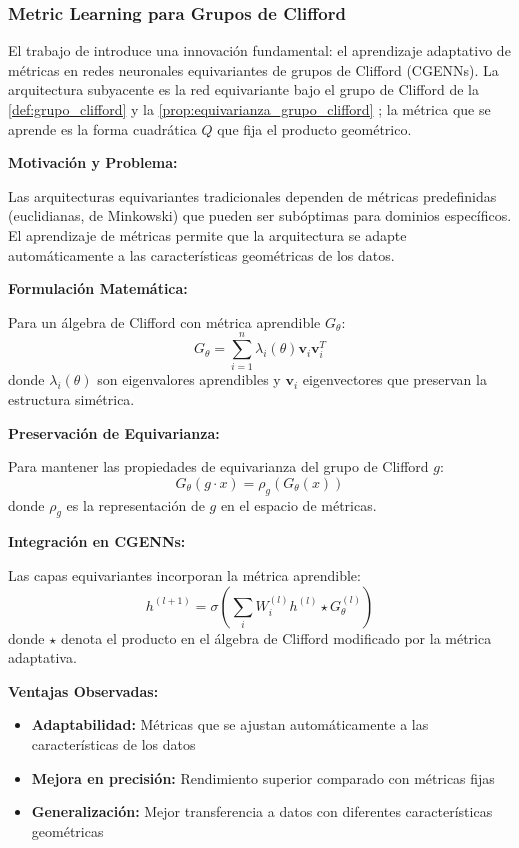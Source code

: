 \subsubsection{Metric Learning para Grupos de Clifford}

El trabajo de \citet{ali2024metriclearning} introduce una innovación fundamental: el aprendizaje adaptativo de métricas en redes neuronales equivariantes de grupos de Clifford (CGENNs). La arquitectura subyacente es la red equivariante bajo el grupo de Clifford de la \autoref{def:grupo_clifford} y la \autoref{prop:equivarianza_grupo_clifford} \citep{ruhe2023cliffordgroup, ali2024metriclearning}; la métrica que se aprende es la forma cuadrática $Q$ que fija el producto geométrico.

\textbf{Motivación y Problema:}

Las arquitecturas equivariantes tradicionales dependen de métricas predefinidas (euclidianas, de Minkowski) que pueden ser subóptimas para dominios específicos. El aprendizaje de métricas permite que la arquitectura se adapte automáticamente a las características geométricas de los datos.

\textbf{Formulación Matemática:}

Para un álgebra de Clifford con métrica aprendible $G_\theta$:
\[G_\theta = \sum_{i=1}^n \lambda_i(\theta) \mathbf{v}_i \mathbf{v}_i^T\]
donde $\lambda_i(\theta)$ son eigenvalores aprendibles y $\mathbf{v}_i$ eigenvectores que preservan la estructura simétrica.

\textbf{Preservación de Equivarianza:}

Para mantener las propiedades de equivarianza del grupo de Clifford $g$:
\[G_\theta(g \cdot x) = \rho_g(G_\theta(x))\]
donde $\rho_g$ es la representación de $g$ en el espacio de métricas.

\textbf{Integración en CGENNs:}

Las capas equivariantes incorporan la métrica aprendible:
\[h^{(l+1)} = \sigma\left(\sum_i W_i^{(l)} h^{(l)} \star G_\theta^{(l)}\right)\]
donde $\star$ denota el producto en el álgebra de Clifford modificado por la métrica adaptativa.

\textbf{Ventajas Observadas:}
\begin{itemize}
    \item \textbf{Adaptabilidad:} Métricas que se ajustan automáticamente a las características de los datos
    \item \textbf{Mejora en precisión:} Rendimiento superior comparado con métricas fijas
    \item \textbf{Generalización:} Mejor transferencia a datos con diferentes características geométricas
\end{itemize}

